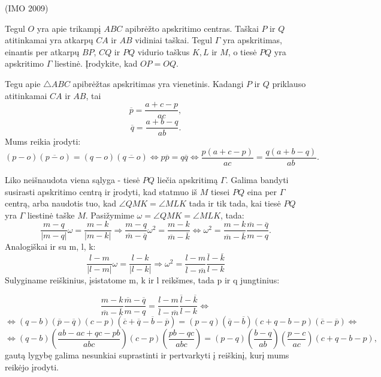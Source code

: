 \documentclass[11pt,a4paper,twoside]{book}
\begin{document}
\begin{pavnr}
(IMO 2009)

Tegul $O$ yra apie trikampį $ABC$ apibrėžto apskritimo centras. Taškai $P$ ir $Q$ atitinkamai yra atkarpų $CA$ ir $AB$ vidiniai taškai. Tegul $\Gamma$ yra apskritimas, einantis per atkarpų $BP$, $CQ$ ir $PQ$ vidurio taškus $K, L$ ir $M$, o tiesė $PQ$ yra apskritimo $\Gamma$ liestinė. Įrodykite, kad $OP = OQ$.
\end{pavnr}
\begin{sprendimas}

Tegu apie $\bigtriangleup ABC$ apibrėžtas apskritimas yra vienetinis. Kadangi $P$ ir $Q$ priklauso atitinkamai $CA$ ir $AB$, tai
$$\overline{p}=\frac{a+c-p}{ac},$$
$$\overline{q}=\frac{a+b-q}{ab}.$$
Mums reikia įrodyti:
$$(p-o)(\overline{p-o})=(q-o)(\overline{q-o}) \Leftrightarrow p\overline{p}=q\overline{q} \Leftrightarrow \frac{p(a+c-p)}{ac}=\frac{q(a+b-q)}{ab}.$$

Liko neišnaudota viena sąlyga - tiesė $PQ$ liečia apskritimą $\Gamma$. Galima bandyti susirasti apskritimo centrą ir įrodyti, kad statmuo iš $M$ tiesei $PQ$ eina per $\Gamma$ centrą, arba naudotis tuo, kad $\angle QMK=\angle MLK$ tada ir tik tada, kai tiesė $PQ$ yra $\Gamma$ liestinė taške $M$. Pasižymime $\omega=\angle QMK=\angle MLK$, tada:
$$\frac{m-q}{|m-q|}\omega=\frac{m-k}{|m-k|} \Rightarrow \frac{m-q}{\overline{m}-\overline{q}}\omega^2=\frac{m-k}{\overline{m}-\overline{k}} \Leftrightarrow \omega^2=\frac{m-k}{\overline{m}-\overline{k}} \frac{\overline{m}-\overline{q}}{m-q}.$$
Analogiškai ir su m, l, k:
$$\frac{l-m}{|l-m|}\omega=\frac{l-k}{|l-k|} \Rightarrow  \omega^2=\frac{l-m}{\overline{l}-\overline{m}}\frac{\overline{l}-\overline{k}}{l-k}$$
Sulyginame reiškinius, įsistatome m, k ir l reikšmes, tada p ir q jungtinius:

\begin{equation*}
 \frac{m-k}{\overline{m}-\overline{k}} \frac{\overline{m}-\overline{q}}{m-q}=\frac{l-m}{\overline{l}-\overline{m}}\frac{\overline{l}-\overline{k}}{l-k} \Leftrightarrow 
\end{equation*}
\begin{equation*}
 \Leftrightarrow (q-b)(\overline{p}-\overline{q})(c-p)(\overline{c}+\overline{q}-\overline{b}-\overline{p})=(p-q)(\overline{q}-\overline{b})(c+q-b-p)(\overline{c}-\overline{p}) \Leftrightarrow
\end{equation*}
\begin{equation*}
\Leftrightarrow (q-b)(\frac{ab-ac+qc-pb}{abc})(c-p)(\frac{pb-qc}{abc})=(p-q)(\frac{b-q}{ab})(\frac{p-c}{ac})(c+q-b-p),
\end{equation*}
gautą lygybę galima nesunkiai suprastinti ir pertvarkyti į reiškinį, kurį mums reikėjo įrodyti.
\end{sprendimas}
\end{document}
